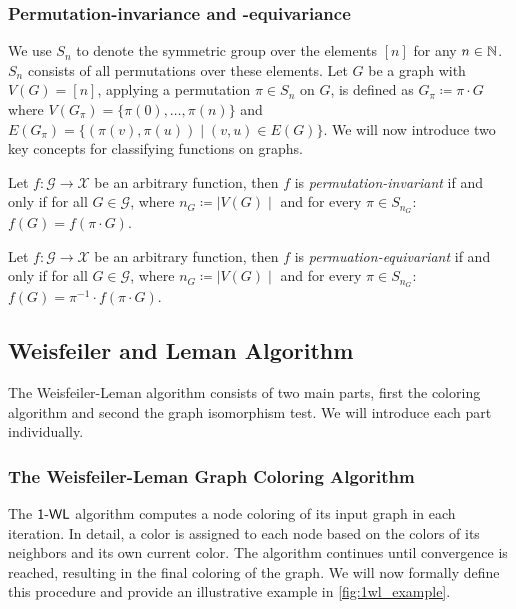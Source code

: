 \subsubsection{Permutation-invariance and -equivariance}
We use $S_n$ to denote the symmetric group over the elements $[n]$ for any $n \in \mathbb{N}$. $S_n$ consists of all permutations over these elements. Let $G$ be a graph with $V(G) = [n]$, applying a permutation $\pi \in S_n$ on $G$, is defined as $G_\pi \coloneqq \pi \cdot G$ where $V(G_\pi) = \{\pi(0), \ldots, \pi(n) \}$ and $E(G_\pi) = \{ (\pi(v), \pi(u)) \mid (v,u) \in E(G)\}$. We will now introduce two key concepts for classifying functions on graphs.

\begin{definition}
    Let $f: \mathcal{G} \rightarrow \mathcal{X}$ be an arbitrary function, then $f$ is \textit{permutation-invariant} if and only if for all $G \in \mathcal{G}$, where $n_G \coloneqq \mid V(G) \mid$ and for every $\pi \in S_{n_G}$: $f(G) = f(\pi \cdot G)$.
\end{definition}

\begin{definition}
    Let $f: \mathcal{G} \rightarrow \mathcal{X}$ be an arbitrary function, then $f$ is \textit{permuation-equivariant} if and only if for all $G \in \mathcal{G}$, where $n_G \coloneqq \mid V(G) \mid$ and for every $\pi \in S_{n_G}$: $f(G) = \pi^{-1} \cdot f(\pi \cdot G)$.
\end{definition}

\subsection{Weisfeiler and Leman Algorithm}\label{sec:1-WL Definition}
The Weisfeiler-Leman algorithm consists of two main parts, first the coloring algorithm and second the graph isomorphism test. We will introduce each part individually.

\subsubsection{The Weisfeiler-Leman Graph Coloring Algorithm}
The $\textsf{1-WL}$ algorithm computes a node coloring of its input graph in each iteration. In detail, a color is assigned to each node based on the colors of its neighbors and its own current color. The algorithm continues until convergence is reached, resulting in the final coloring of the graph. We will now formally define this procedure and provide an illustrative example in \cref{fig:1wl_example}.

